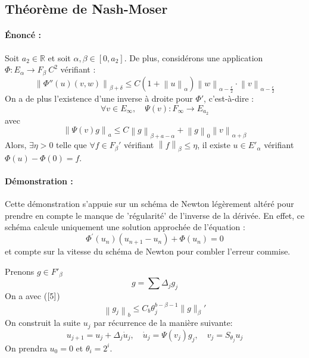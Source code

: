 \documentclass[11pt,a4paper]{article}
\begin{document}
\subsection{Théorème de Nash-Moser}

\paragraph{Énoncé :}
Soit $a_2 \in \mathbb{R}$ et soit $\alpha, \beta \in [0, a_2]$.
De plus, considérons une application $\Phi : E_\alpha \to F_\beta \: C^2$ vérifiant :
\begin{equation}\label{phi''} 
\left\|\Phi''(u)(v,w) \right\|_{\beta + \delta} \leq C (1 + \left\|u \right\|_\alpha) \left\|w \right\|_{\alpha - \frac{\epsilon}{2}} \cdot \left\|v \right\|_{\alpha - \frac{\epsilon}{2}} 
\end{equation}  
On a de plus l'existence d'une inverse à droite pour $\Phi'$, c'est-à-dire :
\[
\forall v \in E_\infty, \quad \Psi(v) : F_\infty \to E_{a_2}
\]
avec 
\begin{equation}\label{estimation psi}
\left\| \Psi(v)g \right\|_a \leq C \left\| g \right\|_{\beta + a - \alpha} + \left\| g \right\|_0 \left\| v \right\|_{\alpha + \beta} 
\end{equation}
Alors, $\exists \eta > 0$ telle que $\forall f \in F_\beta'$ vérifiant $ \left\| f \right\|_\beta \leq \eta$, il existe $u \in E'_\alpha$ vérifiant $\Phi(u) - \Phi(0) = f$.

\paragraph{Démonstration :}
Cette démonstration s'appuie sur un schéma de Newton légèrement altéré pour prendre en compte le manque de 'régularité' de l'inverse de la dérivée. En effet, ce schéma calcule uniquement une solution approchée de l'équation :
\[  
\Phi^{\prime}\left(u_n\right)\left(u_{n+1} - u_n\right) + \Phi\left(u_n\right) = 0 
\]
et compte sur la vitesse du schéma de Newton pour combler l'erreur commise.

Prenons $g \in F'_\beta$
\[ 
g = \sum \Delta_j g_j 
\]
On a avec ($\ref{5}$)
\begin{equation}\label{gj}   
\left\|g_j\right\|_b \leq C_b \theta_j^{b-\beta-1}\|g\|_\beta'
\end{equation} 
On construit la suite $u_j$ par récurrence de la manière suivante:
\[ 
u_{j+1} = u_j + \Delta_j \dot{u}_j, \quad \dot{u}_j = \Psi\left(v_j\right) g_j, \quad v_j = S_{\theta_j} u_j
\]
On prendra $u_0 = 0$ et $\theta_i = 2^i$.
\end{document}
